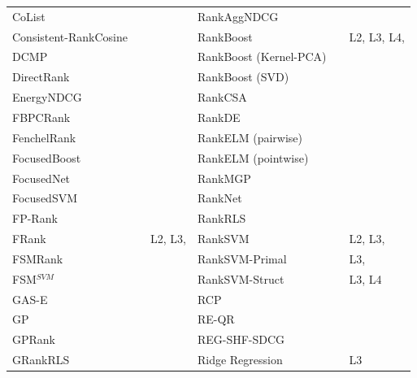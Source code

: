 \documentclass{llncs}
\begin{document}
\begin{table}[!hpt]
{\begin{tabular}{lll|lll}
CoList & \cite{Gao2014} & \cite{Gao2014} & RankAggNDCG & \cite{Wang2013} & \cite{Wang2013} \\
Consistent-RankCosine & \cite{Ravikumar2011} & \cite{Tan2013} & RankBoost & \cite{Freund2003} & L2, L3, L4, \cite{Busa-Fekete2013,Alcantara2010,Sato2013} \\
DCMP & \cite{Renjifo2012}  & \cite{Renjifo2012}  & RankBoost (Kernel-PCA) & \cite{Duh2008} & \cite{Duh2008,Sato2013} \\
DirectRank & \cite{Tan2013} & \cite{Tan2013} & RankBoost (SVD) & \cite{Lin2009} & \cite{Lin2009} \\
EnergyNDCG & \cite{Freno2011} & \cite{Freno2011} & RankCSA & \cite{He2010} & \cite{He2010} \\
FBPCRank & \cite{Lai2011} & \cite{Lai2011} & RankDE & \cite{Bollegala2011} & \cite{Sato2013} \\
FenchelRank & \cite{Lai2013} & \cite{Lai2013,Lai2013b,Laporte2013} & RankELM (pairwise) & \cite{Zong2013} & \cite{Zong2013} \\ 
FocusedBoost & \cite{Niu2012} & \cite{Niu2012} &  RankELM (pointwise) & \cite{Zong2013} & \cite{Zong2013} \\ 
FocusedNet & \cite{Niu2012} & \cite{Niu2012} & RankMGP & \cite{Lin2012} & \cite{Lin2012} \\ 
FocusedSVM & \cite{Niu2012} & \cite{Niu2012} & RankNet & \cite{Burges2005} & \cite{Busa-Fekete2013,Papini2012,Niu2012} \\ 
FP-Rank & \cite{Song2013} & \cite{Song2013} & RankRLS & \cite{Pahikkala2009} & \cite{Pahikkala2010} \\ 
FRank & \cite{Tsai2007} & L2, L3, \cite{Wang2012} & RankSVM & \cite{Herbrich1999,Joachims2002} & L2, L3, \cite{Busa-Fekete2013,Freno2011,He2010,Alcantara2010,Papini2012} \\ 
FSMRank & \cite{Lai2013c} & \cite{Lai2013c,Laporte2013} & RankSVM-Primal &  & L3, \cite{Lai2011} \\ 
FSM$^{SVM}$ & \cite{Lai2013c} & \cite{Lai2013c} & RankSVM-Struct &  & L3, L4 \\
GAS-E & \cite{Geng2007} & \cite{Lai2013c} & RCP & \cite{Elsas2008} & \cite{Elsas2008} \\ 
GP & \cite{DeAlmeida2007} & \cite{Alcantara2010} & RE-QR & \cite{Veloso2010} & \cite{Veloso2010} \\
GPRank & \cite{Silva2009} & \cite{Torkestani2012} & REG-SHF-SDCG & \cite{Wu2009} & \cite{Wu2009} \\  
GRankRLS & \cite{Pahikkala2010} & \cite{Pahikkala2010} & Ridge Regression & \cite{Cossock2006} & L3 \\

\end{tabular}}
\end{table}
\end{document}
